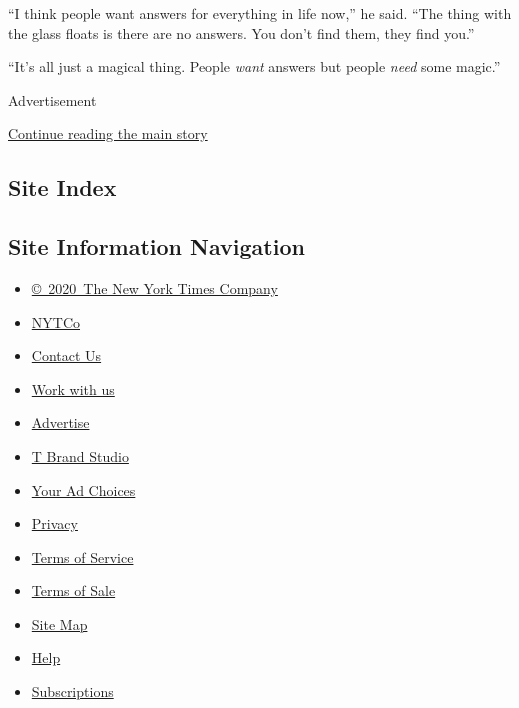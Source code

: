 ``I think people want answers for everything in life now,'' he said.
``The thing with the glass floats is there are no answers. You don't
find them, they find you.''

``It's all just a magical thing. People \emph{want} answers but people
\emph{need} some magic.''

Advertisement

\protect\hyperlink{after-bottom}{Continue reading the main story}

\hypertarget{site-index}{%
\subsection{Site Index}\label{site-index}}

\hypertarget{site-information-navigation}{%
\subsection{Site Information
Navigation}\label{site-information-navigation}}

\begin{itemize}
\tightlist
\item
  \href{https://help.nytimes3xbfgragh.onion/hc/en-us/articles/115014792127-Copyright-notice}{©~2020~The
  New York Times Company}
\end{itemize}

\begin{itemize}
\tightlist
\item
  \href{https://www.nytco.com/}{NYTCo}
\item
  \href{https://help.nytimes3xbfgragh.onion/hc/en-us/articles/115015385887-Contact-Us}{Contact
  Us}
\item
  \href{https://www.nytco.com/careers/}{Work with us}
\item
  \href{https://nytmediakit.com/}{Advertise}
\item
  \href{http://www.tbrandstudio.com/}{T Brand Studio}
\item
  \href{https://www.nytimes3xbfgragh.onion/privacy/cookie-policy\#how-do-i-manage-trackers}{Your
  Ad Choices}
\item
  \href{https://www.nytimes3xbfgragh.onion/privacy}{Privacy}
\item
  \href{https://help.nytimes3xbfgragh.onion/hc/en-us/articles/115014893428-Terms-of-service}{Terms
  of Service}
\item
  \href{https://help.nytimes3xbfgragh.onion/hc/en-us/articles/115014893968-Terms-of-sale}{Terms
  of Sale}
\item
  \href{https://spiderbites.nytimes3xbfgragh.onion}{Site Map}
\item
  \href{https://help.nytimes3xbfgragh.onion/hc/en-us}{Help}
\item
  \href{https://www.nytimes3xbfgragh.onion/subscription?campaignId=37WXW}{Subscriptions}
\end{itemize}
